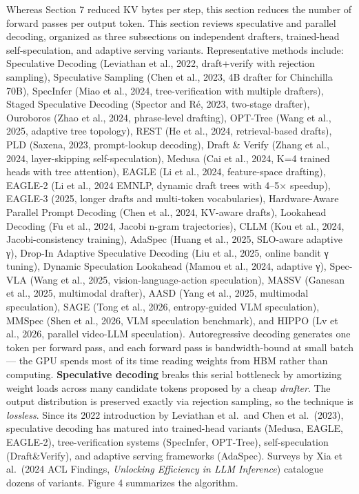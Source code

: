 \documentclass{article}
\begin{document}
Whereas Section 7 reduced KV bytes per step, this section reduces the number of forward passes per output token. This section reviews speculative and parallel decoding, organized as three subsections on independent drafters, trained-head self-speculation, and adaptive serving variants. Representative methods include: Speculative Decoding (Leviathan et al., 2022, draft+verify with rejection sampling), Speculative Sampling (Chen et al., 2023, 4B drafter for Chinchilla 70B), SpecInfer (Miao et al., 2024, tree-verification with multiple drafters), Staged Speculative Decoding (Spector and Ré, 2023, two-stage drafter), Ouroboros (Zhao et al., 2024, phrase-level drafting), OPT-Tree (Wang et al., 2025, adaptive tree topology), REST (He et al., 2024, retrieval-based drafts), PLD (Saxena, 2023, prompt-lookup decoding), Draft \& Verify (Zhang et al., 2024, layer-skipping self-speculation), Medusa (Cai et al., 2024, K=4 trained heads with tree attention), EAGLE (Li et al., 2024, feature-space drafting), EAGLE-2 (Li et al., 2024 EMNLP, dynamic draft trees with 4--5× speedup), EAGLE-3 (2025, longer drafts and multi-token vocabularies), Hardware-Aware Parallel Prompt Decoding (Chen et al., 2024, KV-aware drafts), Lookahead Decoding (Fu et al., 2024, Jacobi n-gram trajectories), CLLM (Kou et al., 2024, Jacobi-consistency training), AdaSpec (Huang et al., 2025, SLO-aware adaptive γ), Drop-In Adaptive Speculative Decoding (Liu et al., 2025, online bandit γ tuning), Dynamic Speculation Lookahead (Mamou et al., 2024, adaptive γ), Spec-VLA (Wang et al., 2025, vision-language-action speculation), MASSV (Ganesan et al., 2025, multimodal drafter), AASD (Yang et al., 2025, multimodal speculation), SAGE (Tong et al., 2026, entropy-guided VLM speculation), MMSpec (Shen et al., 2026, VLM speculation benchmark), and HIPPO (Lv et al., 2026, parallel video-LLM speculation). Autoregressive decoding generates one token per forward pass, and each forward pass is bandwidth-bound at small batch --- the GPU spends most of its time reading weights from HBM rather than computing. \textbf{Speculative decoding} breaks this serial bottleneck by amortizing weight loads across many candidate tokens proposed by a cheap \emph{drafter}. The output distribution is preserved exactly via rejection sampling, so the technique is \emph{lossless}. Since its 2022 introduction by Leviathan et al.~and Chen et al.~(2023), speculative decoding has matured into trained-head variants (Medusa, EAGLE, EAGLE-2), tree-verification systems (SpecInfer, OPT-Tree), self-speculation (Draft\&Verify), and adaptive serving frameworks (AdaSpec). Surveys by Xia et al.~(2024 ACL Findings, \emph{Unlocking Efficiency in LLM Inference}) catalogue dozens of variants. Figure 4 summarizes the algorithm.
\end{document}
